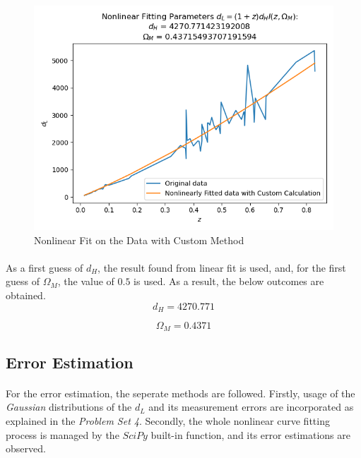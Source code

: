 \documentclass[letterpaper,12pt]{article}
\begin{document}
\begin{figure}[H]
    \centerline{\includegraphics[width=\linewidth]{figures/nonlinfit.png}}
    \caption{Nonlinear Fit on the Data with Custom Method}
    \label{fig:nonlinfit}
    \end{figure}

\paragraph{} As a first guess of $d_H$, the result found from linear fit is used, and, for the first guess of $\Omega_M$, the value of $0.5$ is used. As a result, the below outcomes are obtained.
\begin{equation*}
    d_H = 4270.771
\end{equation*}

\begin{equation*}
    \Omega_M = 0.4371
\end{equation*}

\subsection{Error Estimation}
\paragraph{} For the error estimation, the seperate methods are followed. Firstly, usage of the \textit{Gaussian} distributions of the $d_L$ and its measurement errors are incorporated as explained in the \textit{Problem Set 4}. Secondly, the whole nonlinear curve fitting process is managed by the $SciPy$ built-in function, and its error estimations are observed.
\end{document}
